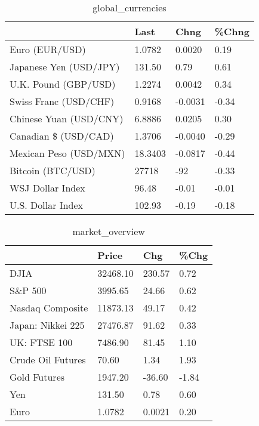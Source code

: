 \documentclass{article}%
\begin{document}
%


\begin{table}[htbp]%
\caption{global\_currencies}%
\centering%
\begin{adjustbox}{width=1\textwidth}%
\begin{tabular}{llll}
\toprule
                       &    Last &    Chng & \%Chng \\
\midrule
        Euro (EUR/USD) &  1.0782 &  0.0020 &  0.19 \\
Japanese Yen (USD/JPY) &  131.50 &    0.79 &  0.61 \\
  U.K. Pound (GBP/USD) &  1.2274 &  0.0042 &  0.34 \\
 Swiss Franc (USD/CHF) &  0.9168 & -0.0031 & -0.34 \\
Chinese Yuan (USD/CNY) &  6.8886 &  0.0205 &  0.30 \\
  Canadian \$ (USD/CAD) &  1.3706 & -0.0040 & -0.29 \\
Mexican Peso (USD/MXN) & 18.3403 & -0.0817 & -0.44 \\
     Bitcoin (BTC/USD) &   27718 &     -92 & -0.33 \\
      WSJ Dollar Index &   96.48 &   -0.01 & -0.01 \\
     U.S. Dollar Index &  102.93 &   -0.19 & -0.18 \\
\bottomrule
\end{tabular}
%
\end{adjustbox}%
\end{table}

%


\begin{table}[htbp]%
\caption{market\_overview}%
\centering%
\begin{adjustbox}{width=1\textwidth}%
\begin{tabular}{llll}
\toprule
                  &    Price &    Chg &  \%Chg \\
\midrule
             DJIA & 32468.10 & 230.57 &  0.72 \\
          S\&P 500 &  3995.65 &  24.66 &  0.62 \\
 Nasdaq Composite & 11873.13 &  49.17 &  0.42 \\
Japan: Nikkei 225 & 27476.87 &  91.62 &  0.33 \\
     UK: FTSE 100 &  7486.90 &  81.45 &  1.10 \\
Crude Oil Futures &    70.60 &   1.34 &  1.93 \\
     Gold Futures &  1947.20 & -36.60 & -1.84 \\
              Yen &   131.50 &   0.78 &  0.60 \\
             Euro &   1.0782 & 0.0021 &  0.20 \\
\bottomrule
\end{tabular}
%
\end{adjustbox}%
\end{table}

%
\end{document}
